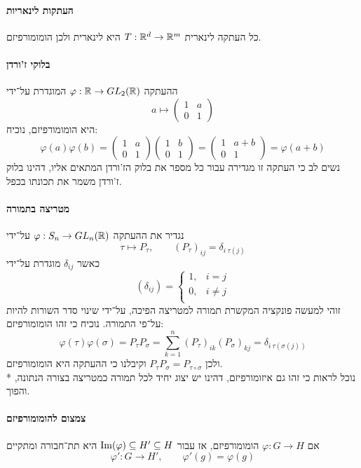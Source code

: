 \paragraph{העתקות לינאריות}
כל העתקה לינארית $T : \mathbb{R}^d \to \mathbb{R}^m$ היא לינארית ולכן הומומורפיזם.

\paragraph{בלוקי ז'ורדן}
ההעתקה $\varphi : \mathbb{R} \to GL_2(\mathbb{R})$ המוגדרת על־ידי
\[
	a \mapsto \begin{pmatrix}
		1 & a \\
		0 & 1
	\end{pmatrix}
\]
היא הומומורפיזם, נוכיח:
\[
	\varphi(a)\varphi(b)
	=
	\begin{pmatrix}
		1 & a \\
		0 & 1
	\end{pmatrix}
	\begin{pmatrix}
		1 & b \\
		0 & 1
	\end{pmatrix}
	=
	\begin{pmatrix}
		1 & a + b \\
		0 & 1
	\end{pmatrix}
	= \varphi(a + b)
\]
נשים לב כי העתקה זו מגדירה עבור כל מספר את בלוק הז'ורדן המתאים אליו, דהינו בלוק ז'ורדן משמר את תכונתו בכפל.

\paragraph{מטריצה בתמורה}
נגדיר את ההעתקה $\varphi : S_n \to GL_n(\mathbb{R})$ על־ידי
\[
	\tau \mapsto P_\tau,
	\qquad
	{(P_\tau)}_{ij} = \delta_{i\ \tau(j)}
\]
כאשר $\delta_{ij}$ מוגדרת על־ידי
\[
	(\delta_{ij}) = \begin{cases}
		1, & i = j \\
		0, & i \ne j \\
	\end{cases}
\]
זוהי למעשה פונקציה המקשרת תמורה למטריצה הפיכה, על־ידי שינוי סדר השורות להיות על־פי התמורה. נוכיח כי זהו הומומורפיזם:
\[
	\varphi(\tau)\varphi(\sigma)
	= P_\tau P_\sigma
	= \sum_{k = 1}^{n} {(P_\tau)}_{ik} {(P_\sigma)}_{kj}
	= \delta_{i\ \tau(\sigma(j))}
\]
ולכן $P_\tau P_\sigma = P_{\tau \circ \sigma}$ וקיבלנו כי ההעתקה היא הומומורפיזם. \\*
נוכל לראות כי זהו גם איזומורפיזם, דהינו יש יצוג יחיד לכל תמורה כמטריצה בצורה הנתונה, והפוך.

\paragraph{צמצום להומומורפיזם}
אם $\varphi : G \to H$ הומומורפיזם, אז עבור $\operatorname{Im}(\varphi) \subseteq H' \subseteq H$ היא תת־חבורה ומתקיים
\[
	\varphi' : G \to H',
	\qquad
	\varphi'(g) = \varphi(g)
\]

